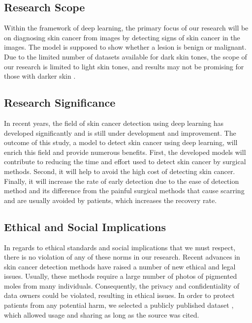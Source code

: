 \documentclass[12pt]{diazessay}
\begin{document}
    \subsection{Research Scope}
    \hspace{0.7cm} Within the framework of deep learning, the primary focus of our research will be on diagnosing skin cancer from images by detecting signs of skin cancer in the images. The model is supposed to show whether a lesion is benign or malignant. Due to the limited number of datasets available for dark skin tones, the scope of our research is limited to light skin tones, and results may not be promising for those with darker skin \cite{rotemberg2021patient}.
    
    \subsection{Research Significance}
    \hspace{0.7cm} In recent years, the field of skin cancer detection using deep learning has developed significantly and is still under development and improvement. The outcome of this study, a model to detect skin cancer using deep learning, will enrich this field and provide numerous benefits. First, the developed models will contribute to reducing the time and effort used to detect skin cancer by surgical methods. Second, it will help to avoid the high cost of detecting skin cancer. Finally, it will increase the rate of early detection due to the ease of detection method and its difference from the painful surgical methods that cause scarring and are usually avoided by patients, which increases the recovery rate.
    
    \subsection{Ethical and Social Implications}
    \hspace{0.7cm} In regards to ethical standards and social implications that we must respect, there is no violation of any of these norms in our research.
    Recent advances in skin cancer detection methods have raised a number of new ethical and legal issues. Usually, these methods require a large number of photos of pigmented moles from many individuals. Consequently, the privacy and confidentiality of data owners could be violated, resulting in ethical issues. 
    In order to protect patients from any potential harm, we selected a publicly published dataset \cite{ISICdataset}, which allowed usage and sharing as long as the source was cited.
    
\end{document}

